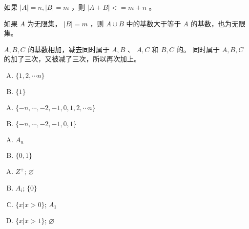 {{        %
        \begin{practices}
            如果 $|A| = n, |B| = m$ ，则 $|A + B| <= m + n$ 。
        \end{practices}

        \begin{practices}
            如果 $A$ 为无限集， $|B| = m$ ，则 $A \cup B$ 中的基数大于等于 $A$ 的基数，也为无限集。
        \end{practices}

        \begin{practices}
            $A, B, C$ 的基数相加，减去同时属于 $A, B$ 、 $A, C$ 和 $B, C$ 的。
            同时属于 $A, B, C$ 的加了三次，又被减了三次，所以再次加上。
        \end{practices}

        \begin{practices}
            \begin{enumerate}[A.]
                \item $\{1, 2, \cdots n\}$
                \item $\{1\}$
            \end{enumerate}
        \end{practices}

        \begin{practices}
            \begin{enumerate}[A.]
                \item $\{-n, \cdots, -2, -1, 0, 1, 2, \cdots n\}$
                \item $\{-n, \cdots, -2, -1, 0, 1\}$
            \end{enumerate}
        \end{practices}

        \begin{practices}
            \begin{enumerate}[A.]
                \item $A_n$
                \item $\{0, 1\}$
            \end{enumerate}
        \end{practices}

        \begin{practices}
            \begin{enumerate}[A.]
                \item $Z^+$; $\varnothing$
                \item $A_i$; $\{0\}$
                \item $\{x | x > 0\}$; $A_1$
                \item $\{x | x > 1\}$; $\varnothing$
            \end{enumerate}
        \end{practices}

}}
